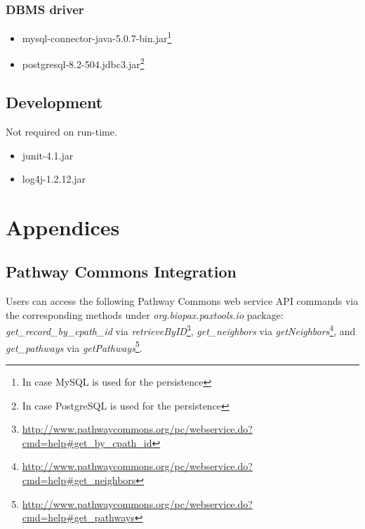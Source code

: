 \documentclass[10pt]{article}
\begin{document}
\subsubsection{DBMS driver}
\begin{itemize}
   \item mysql-connector-java-5.0.7-bin.jar\footnote{In case MySQL is used for the persistence}
   \item postgresql-8.2-504.jdbc3.jar\footnote{In case PostgreSQL is used for the persistence}
\end{itemize}

\subsection{Development}
Not required on run-time.
\begin{itemize}
   \item junit-4.1.jar
   \item log4j-1.2.12.jar
\end{itemize}

%
%

\section{Appendices}
\subsection{Pathway Commons Integration}
\label{appendix:pc}
Users can access the following Pathway Commons web service API commands via the corresponding methods under \textit{org.biopax.paxtools.io} package: \textit{get\_record\_by\_cpath\_id} via 
\textit{retrieveByID}\footnote{\href{http://www.pathwaycommons.org/pc/webservice.do?cmd=help\#get\_by\_cpath\_id}{http://www.pathwaycommons.org/pc/webservice.do?cmd=help\#get\_by\_cpath\_id}}, \textit{get\_neighbors} via \textit{getNeighbors}\footnote{\href{http://www.pathwaycommons.org/pc/webservice.do?cmd=help\#get\_neighbors}{http://www.pathwaycommons.org/pc/webservice.do?cmd=help\#get\_neighbors}}, and \textit{get\_pathways} via \textit{getPathways}\footnote{\href{http://www.pathwaycommons.org/pc/webservice.do?cmd=help\#get\_pathways}{http://www.pathwaycommons.org/pc/webservice.do?cmd=help\#get\_pathways}}.
\end{document}
